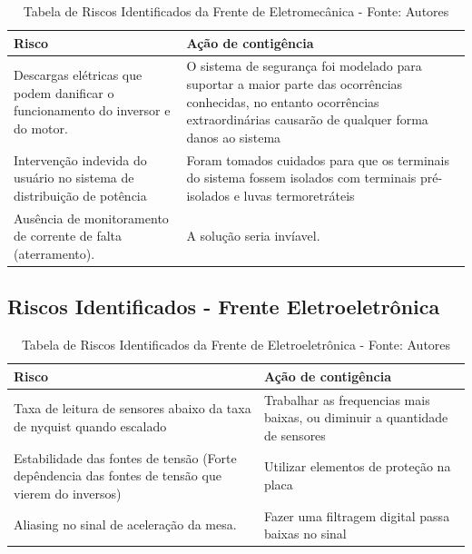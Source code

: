 \begin{table}[H]
    \begin{tabular}{|p{7cm}|p{7cm}|}
        \hline
        \textbf{Risco} & \textbf{Ação de contigência} \\ \hline
        Descargas elétricas que podem danificar o funcionamento do inversor e do motor. & O sistema de segurança foi modelado para suportar a maior parte das ocorrências conhecidas, no entanto ocorrências extraordinárias causarão de qualquer forma danos ao sistema \\ \hline
        Intervenção indevida do usuário no sistema de distribuição de potência & Foram tomados cuidados para que os terminais do sistema fossem isolados com terminais pré-isolados e luvas termoretráteis \\ \hline
        Ausência de monitoramento de corrente de falta (aterramento). & A solução seria invíavel. \\ \hline
    \end{tabular}
    \caption{Tabela de Riscos Identificados da Frente de Eletromecânica - Fonte: Autores}
    \label{tab:tabela_riscos_eletromecanica}
\end{table}

\subsection*{Riscos Identificados - Frente Eletroeletrônica}

\begin{table}[H]
    \begin{tabular}{|p{7cm}|p{7cm}|}
        \hline
        \textbf{Risco} & \textbf{Ação de contigência} \\ \hline
        Taxa de leitura de sensores abaixo da taxa de nyquist quando escalado & Trabalhar as frequencias mais baixas, ou diminuir a quantidade de sensores \\ \hline
        Estabilidade das fontes de tensão (Forte depêndencia das fontes de tensão que vierem do inversos) & Utilizar elementos de proteção na placa \\ \hline
        Aliasing no sinal de aceleração da mesa. & Fazer uma filtragem digital passa baixas no sinal \\ \hline
    \end{tabular}
    \caption{Tabela de Riscos Identificados da Frente de Eletroeletrônica - Fonte: Autores}
    \label{tab:tabela_riscos_eletroeletronica}
\end{table}

